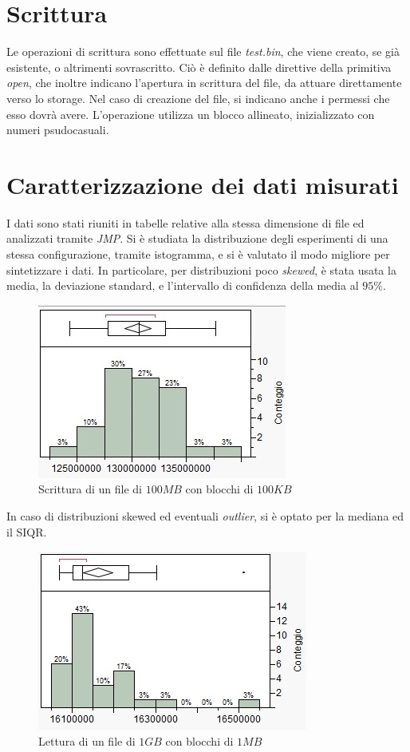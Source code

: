 	\section{Scrittura}
		Le operazioni di scrittura sono effettuate sul file \emph{test.bin}, che viene creato, se già esistente, o altrimenti sovrascritto. Ciò è definito dalle direttive della primitiva \emph{open}, che inoltre indicano l'apertura in scrittura del file, da attuare direttamente verso lo storage. Nel caso di creazione del file, si indicano anche i permessi che esso dovrà avere. L'operazione utilizza un blocco allineato, inizializzato con numeri psudocasuali.
		
		
	\section{Caratterizzazione dei dati misurati}
		I dati sono stati riuniti in tabelle relative alla stessa dimensione di file ed analizzati tramite \emph{JMP}. Si è studiata la distribuzione degli esperimenti di una stessa configurazione, tramite istogramma, e si è valutato il modo migliore per sintetizzare i dati. In particolare, per distribuzioni poco \emph{skewed}, è stata usata la media, la deviazione standard, e l'intervallo di confidenza della media al $95\%$.
		\begin{figure}[H]
			\centering
			\includegraphics[]{./immagine/W100MBx100KB.jpg}
			\caption{Scrittura di un file di $100MB$ con blocchi di $100KB$}
			\label{fig:b-w100}
		\end{figure}
		In caso di distribuzioni skewed ed eventuali \emph{outlier}, si è optato per la mediana ed il SIQR.
				\begin{figure}[H]
			\centering
			\includegraphics[]{./immagine/R1GBx1MB.jpg}
			\caption{Lettura di un file di $1GB$ con blocchi di $1MB$}
			\label{fig:b-r1}
		\end{figure}

